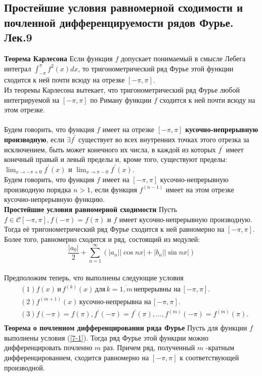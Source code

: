 \documentclass{article}
\begin{document}
\subsection{Простейшие условия равномерной сходимости и почленной дифференцируемости рядов Фурье. Лек.9}
	\textbf{Теорема Карлесона} Если функция $ f $ допускает понимаемый в смысле Лебега интеграл $ \int_{-\pi}^{\pi} f^{2}(x) d x$, то тригонометрический ряд Фурье этой функции сходится к ней почти всюду на отрезке $ [-\pi, \pi]$.\\
	Из теоремы Карлесона вытекает, что тригонометрический ряд Фурье любой интегрируемой на $ [-\pi, \pi] $ по Риману функции $ f $ сходится к ней почти всюду на этом отрезке.\\
	\\
	Будем говорить, что функция $ f $ имеет на отрезке $ [-\pi, \pi] $ \textbf{кусочно-непрерывную производную}, если $ \exists f^{\prime} $ существует во всех внутренних точках этого отрезка за исключением, быть может конечного их числа, в каждой из которых $ f^{\prime} $ имеет конечный правый и левый пределы и, кроме того, существуют пределы: $ \lim _{x \rightarrow-\pi+0} f^{\prime}(x) $ и $ \lim _{x \rightarrow \pi-0} f^{\prime}(x)$.\\
	Будем говорить, что функция $ f $ имеет на $ [-\pi, \pi] $ кусочно-непрерывную производную порядка $ n>1$, если функция $ f^{(n-1)} $ имеет на этом отрезке кусочно-непрерывную функцию.\\
	\textbf{Простейшие условия равномерной сходимости} Пусть $ f \in \mathcal{C}[-\pi, \pi], f(-\pi)=f(\pi)$ и $f$ имеет кусочно-непрерывную производную. Тогда её тригонометрический ряд Фурье сходится к ней равномерно на $ [-\pi, \pi] $. Более того, равномерно сходится и ряд, состоящий из модулей:
	\begin{equation}
	\frac{\left|a_{0}\right|}{2}+\sum_{n=1}^{\infty}\left(\left|a_{n}\right||\cos n x|+\left|b_{n}\right||\sin n x|\right)
	\end{equation}
	\\
	Предположим теперь, что выполнены следующие условия\\
	\begin{equation}
	\label{7-1}
	\begin{aligned}
	&(1) f(x) \, \text{и} \, f^{(k)}(x) \, \text{для} \, k=\overline{1, m} \, \text{непрерывны на} \, [-\pi, \pi] . \\
	&(2)  f^{(m+1)}(x) \, \text{кусочно-непрерывна на} \, [-\pi, \pi].\\
	&(3)  f(-\pi)=f(\pi), f^{\prime}(-\pi)=f^{\prime}(\pi), \ldots, f^{(m)}(-\pi)=f^{(m)}(\pi).\\
	\end{aligned}
	\end{equation}
	\textbf{Теорема о почленном дифференцировании ряда Фурье} Пусть для функции $ f $ выполнены условия (\ref{7-1}). Тогда ряд Фурье этой функции можно дифференцировать почленно $ m $ раз. Причем ряд, полученный $ m $ -кратным дифференцированием, сходится равномерно на $ [-\pi, \pi] $ к соответствующей производной.\\
\end{document}
